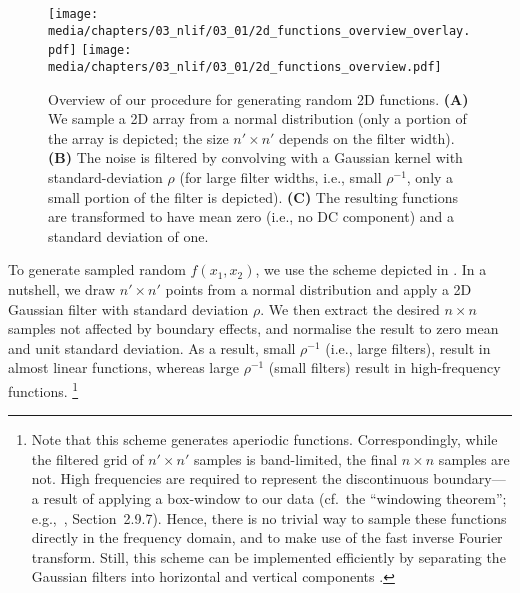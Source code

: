 \begin{figure}
	\texttt{[image: media/chapters/03\_nlif/03\_01/2d\_functions\_overview\_overlay.pdf]}%
	\kern-157.24mm\texttt{[image: media/chapters/03\_nlif/03\_01/2d\_functions\_overview.pdf]}
	\caption[Overview of our procedure for generating random 2D functions]{Overview of our procedure for generating random 2D functions. \textbf{(A)} We sample a 2D array from a normal distribution (only a portion of the array is depicted; the size $n' \times n'$ depends on the filter width). \textbf{(B)} The noise is filtered by convolving with a Gaussian kernel with standard-deviation $\rho$ (for large filter widths, i.e., small $\rho^{-1}$, only a small portion of the filter is depicted). \textbf{(C)} The resulting functions are transformed to have mean zero (i.e., no DC component) and a standard deviation of one.}
	\label{fig:2d_functions_overview}
\end{figure}

To generate sampled random $f(x_1, x_2)$, we use the scheme depicted in .
In a nutshell, we draw $n' \times n'$ points from a normal distribution and apply a 2D Gaussian filter with standard deviation $\rho$.
We then extract the desired $n \times n$ samples not affected by boundary effects, and normalise the result to zero mean and unit standard deviation.
As a result, small $\rho^{-1}$ (i.e., large filters), result in almost linear functions, whereas large $\rho^{-1}$ (small filters) result in high-frequency functions.%
\footnote{
Note that this scheme generates aperiodic functions.
Correspondingly, while the filtered grid of $n' \times n'$ samples is band-limited, the final $n \times n$ samples are not.
High frequencies are required to represent the discontinuous boundary---a result of applying a box-window to our data (cf.~the \enquote{windowing theorem}; e.g.,~\cite{oppenheim2009discretetime}, Section~2.9.7).
Hence, there is no trivial way to sample these functions directly in the frequency domain, and to make use of the fast inverse Fourier transform.
Still, this scheme can be implemented efficiently by separating the Gaussian filters into horizontal and vertical components \citep[e.g.,][]{bolon2006twodimensional}.
}

